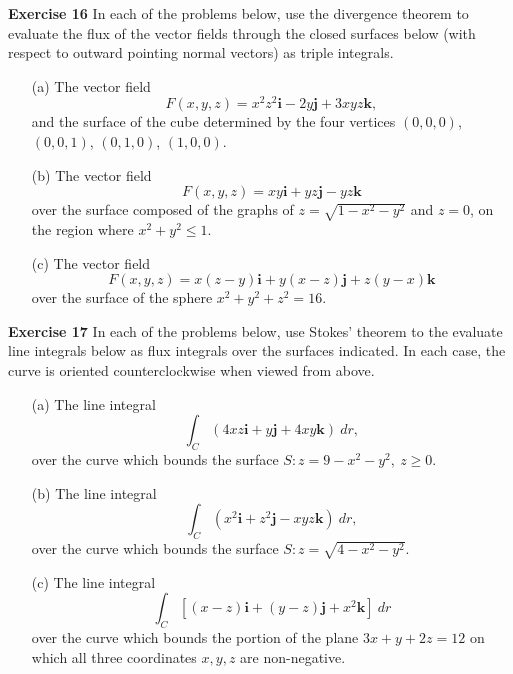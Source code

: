 \documentclass[12pt,oneside]{exam}
\newenvironment{exercise}[1]{\vspace{.1in}\noindent\textbf{Exercise #1 \hspace{.05em}}}{}
\begin{document}
\begin{exercise}{16} 
In each of the problems below, use the divergence theorem to evaluate the flux of the vector fields through the closed surfaces below (with respect to outward pointing normal vectors) as triple integrals. 
\begin{itemize}
\item[(a)] The vector field 
\begin{equation*}
F(x,y,z)=x^2z^2\textbf{i}-2y\textbf{j}+3xyz\textbf{k},
\end{equation*}
and the surface of the cube determined by the four vertices $(0,0,0)$, $(0,0,1)$, $(0,1,0)$, $(1,0,0)$. 
\item[(b)] The vector field
\begin{equation*}
F(x,y,z)= xy\textbf{i} + yz\textbf{j} -yz\textbf{k}
\end{equation*}
over the surface composed of the graphs of $z=\sqrt{1-x^2-y^2}$ and $z=0$, on the region where $x^2+y^2 \leq 1$. 
\item[(c)] The vector field 
\begin{equation*}
F(x,y,z)=x(z-y)\textbf{i} + y(x-z)\textbf{j} + z(y-x)\textbf{k} 
\end{equation*}
over the surface of the sphere $x^2+y^2+z^2=16$.
\end{itemize}
\end{exercise}

\begin{exercise}{17}
In each of the problems below, use Stokes' theorem to the evaluate line integrals below as flux integrals over the surfaces indicated. In each case, the curve is oriented counterclockwise when viewed from above. 
\begin{itemize}
\item[(a)]  The line integral
\begin{equation*}
\int_{C} (4xz \textbf{i} + y\textbf{j} + 4xy\textbf{k}) \ dr,
\end{equation*}
over the curve which bounds the surface $S \colon z=9-x^2-y^2, \ z \geq 0$. 
\item[(b)] The line integral 
\begin{equation*}
\int_{C} (x^2\textbf{i} + z^2\textbf{j} -xyz\textbf{k}) \ dr, 
\end{equation*}
over the curve which bounds the surface $S \colon z=\sqrt{4-x^2-y^2}$. 
\item[(c)] The line integral 
\begin{equation*}
\int_{C} [(x-z)\textbf{i} + (y-z)\textbf{j} +x^2\textbf{k}] \ dr
\end{equation*}
over the curve which bounds the portion of the plane $3x+y+2z=12$ on which all three coordinates $x,y,z$ are non-negative. 
\end{itemize}

\end{exercise}
\end{document}

